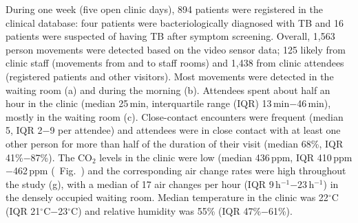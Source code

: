 \documentclass[fleqn,11pt]{wlscirep}
\begin{document}
During one week (five open clinic days), 894 patients were registered in the clinical database: four patients were bacteriologically diagnosed with TB and 16 patients were suspected of having TB after symptom screening. Overall, 1,563 person movements were detected based on the video sensor data; 125 likely from clinic staff (movements from and to staff rooms) and 1,438 from clinic attendees (registered patients and other visitors). Most movements were detected in the waiting room (a) and during the morning (b). Attendees spent about half an hour in the clinic (median 25\,min, interquartile range (IQR) 13\,min$-$46\,min), mostly in the waiting room (c). Close-contact encounters were frequent (median 5, IQR 2$-$9 per attendee) and attendees were in close contact with at least one other person for more than half of the duration of their visit (median 68\%, IQR 41\%$-$87\%). The CO$_2$ levels in the clinic were low (median 436\,ppm, IQR 410\,ppm$-$462\,ppm (\supp~Fig.~) and the corresponding air change rates were high throughout the study (g), with a \eg median of 17 air changes per hour (IQR 9\,h$^{-1}$$-$23\,h$^{-1}$) in the densely occupied waiting room. Median temperature in the clinic was 22$^{\circ}$C (IQR 21$^{\circ}$C$-$23$^{\circ}$C) and relative humidity was 55\% (IQR 47\%$-$61\%).
\end{document}
